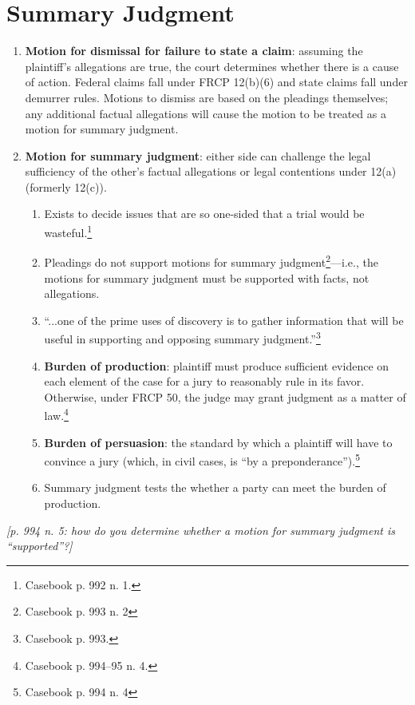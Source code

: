 \section{Summary Judgment}

\begin{enumerate}
    \item \textbf{Motion for dismissal for failure to state a claim}: assuming the plaintiff's allegations are true, the court determines whether there is a cause of action. Federal claims fall under FRCP 12(b)(6) and state claims fall under demurrer rules. Motions to dismiss are based on the pleadings themselves; any additional factual allegations will cause the motion to be treated as a motion for summary judgment.
    \item \textbf{Motion for summary judgment}: either side can challenge the legal sufficiency of the other's factual allegations or legal contentions under 12(a) (formerly 12(c)).
    \begin{enumerate}
        \item Exists to decide issues that are so one-sided that a trial would be wasteful.\footnote{Casebook p. 992 n. 1.}
        \item Pleadings do not support motions for summary judgment\footnote{Casebook p. 993 n. 2}---i.e., the motions for summary judgment must be supported with facts, not allegations.
        \item ``...one of the prime uses of discovery is to gather information that will be useful in supporting and opposing summary judgment.''\footnote{Casebook p. 993.}
        \item \textbf{Burden of production}: plaintiff must produce sufficient evidence on each element of the case for a jury to reasonably rule in its favor. Otherwise, under FRCP 50, the judge may grant judgment as a matter of law.\footnote{Casebook p. 994--95 n. 4.}
        \item \textbf{Burden of persuasion}: the standard by which a plaintiff will have to convince a jury (which, in civil cases, is ``by a preponderance'').\footnote{Casebook p. 994 n. 4}
        \item Summary judgment tests the whether a party can meet the burden of production.
    \end{enumerate}
\end{enumerate}

\emph{[p. 994 n. 5: how do you determine whether a motion for summary judgment is ``supported''?]}

